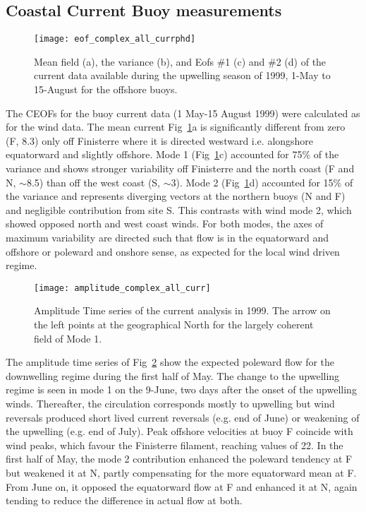 \subsection{Coastal Current Buoy measurements}
\begin{figure}
\centering
\texttt{[image: eof\_complex\_all\_currphd]}
\caption{Mean field (a), the variance (b), and Eofs \#1 (c) and
\#2 (d) of the current data available during the upwelling season
of 1999, 1-May to 15-August for the offshore
buoys.}\label{fig:windsmeanvarbuoyscurr}
\end{figure}

The CEOFs for the buoy current data (1 May-15 August 1999) were
calculated as for the wind data. The mean current
{Fig~\ref{fig:windsmeanvarbuoyscurr}}a is significantly different
from zero (F, 8.3\velc ) only off Finisterre where it is directed
westward i.e. alongshore equatorward and slightly offshore. Mode 1
(Fig~\ref{fig:windsmeanvarbuoyscurr}c) accounted for 75\% of the
variance and shows stronger variability off Finisterre and the
north coast (F and N, $\sim$8.5\velc ) than off the west coast (S,
$\sim$3\velc ). Mode 2 (Fig~\ref{fig:windsmeanvarbuoyscurr}d)
accounted for 15\% of the variance and represents diverging
vectors at the northern buoys (N and F) and negligible
contribution from site S. This contrasts with wind mode 2, which
showed opposed north and west coast winds. For both modes, the
axes of maximum variability are directed such that flow is in the
equatorward and offshore or poleward and onshore sense, as
expected for the local wind driven regime.

\begin{figure}[t]
\centering
\texttt{[image: amplitude\_complex\_all\_curr]}
\caption{Amplitude Time series of the current analysis in 1999.
The arrow on the left points at the geographical North for the
largely coherent field of Mode 1.}\label{fig:windsampbuoyscurr}
\end{figure}
The amplitude time series of {Fig~\ref{fig:windsampbuoyscurr}}
show the expected poleward flow for the downwelling regime during
the first half of May. The change to the upwelling regime is seen
in mode 1 on the 9-June, two days after the onset of the upwelling
winds. Thereafter, the circulation corresponds mostly to upwelling
but wind reversals produced short lived current reversals (e.g.
end of June) or weakening of the upwelling (e.g. end of July).
Peak offshore velocities at buoy F coincide with wind peaks, which
favour the Finisterre filament, reaching values of 22\velc . In
the first half of May, the mode 2 contribution enhanced the
poleward tendency at F but weakened it at N, partly compensating
for the more equatorward mean at F. From June on, it opposed the
equatorward flow at F and enhanced it at N, again tending to
reduce the difference in actual flow at both.

